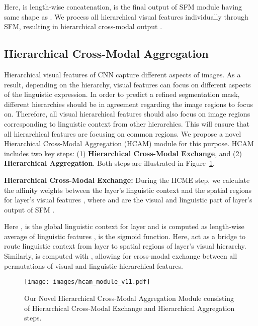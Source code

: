 \documentclass[11pt]{article}
\begin{document}
Here,  is length-wise concatenation,  is the final output of SFM module having same shape as . We process all hierarchical visual features  individually through SFM, resulting in hierarchical cross-modal output .













\subsection{Hierarchical Cross-Modal Aggregation} 
Hierarchical visual features of CNN capture different aspects of images. As a result, depending on the hierarchy, visual features can focus on different aspects of the linguistic expression. In order to predict a refined segmentation mask, different hierarchies should be in agreement regarding the image regions to focus on. Therefore, all visual hierarchical features should also focus on image regions corresponding to linguistic context from other hierarchies. This will ensure that all hierarchical features are focusing on common regions. We propose a novel Hierarchical Cross-Modal Aggregation (HCAM) module for this purpose. HCAM includes two key steps: (1) \textbf{Hierarchical Cross-Modal Exchange}, and (2) \textbf{Hierarchical Aggregation}. Both steps are illustrated in Figure~\ref{fig:cmmlf}.












\textbf{Hierarchical Cross-Modal Exchange:} During the HCME step, we calculate the affinity weights  between the  layer's linguistic context  and the spatial regions for  layer's visual features , where  and  are the visual and linguistic part of  layer's output of SFM .

Here ,  is the global linguistic context for  layer and is computed as length-wise average of linguistic features ,  is the sigmoid function. Here,  act as a bridge to route linguistic context from  layer to spatial regions of  layer's visual hierarchy. Similarly,  is computed with , allowing for cross-modal exchange between all permutations of visual and linguistic hierarchical features.




\begin{figure}[t] \centering
    \texttt{[image: images/hcam\_module\_v11.pdf]}
    \caption{Our Novel Hierarchical Cross-Modal Aggregation Module consisting of Hierarchical Cross-Modal Exchange and Hierarchical Aggregation steps.}
    \label{fig:cmmlf}
\end{figure}
\end{document}
